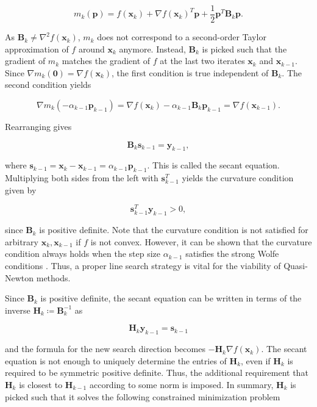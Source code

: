\begin{equation}\label{eq:quasi-newton-model}
    m_k(\bm{p}) = f(\bm{x}_k)  + \nabla f(\bm{x}_k)^T \bm{p} + \frac{1}{2} \bm{p}^T\bm{B}_k\bm{p}.
\end{equation}

\noindent As $\bm{B}_k \neq \nabla^2 f(\bm{x}_k)$, $m_k$ does not correspond to a second-order Taylor approximation of $f$ around 
$\bm{x}_k$ anymore. Instead, $\bm{B}_k$ is picked such that the gradient of $m_k$ matches the gradient of $f$ at the last two iterates 
$\bm{x}_k$ and $\bm{x}_{k-1}$.
Since $\nabla m_{k}(\bm{0}) = \nabla f(\bm{x}_k)$, the first condition is true independent of $\bm{B}_k$. The 
second condition yields

\[
    \nabla m_{k}(-\alpha_{k-1}\bm{p}_{k-1}) = \nabla f(\bm{x}_k) - \alpha_{k-1}\bm{B}_{k}\bm{p}_{k-1} = \nabla f(\bm{x}_{k-1}).
\]

\noindent Rearranging gives

\begin{equation}\label{eq:secant-equation}
    \bm{B}_k \bm{s}_{k-1} = \bm{y}_{k-1},
\end{equation}

\noindent where $\bm{s}_{k-1} = \bm{x}_k - \bm{x}_{k-1} = \alpha_{k-1}\bm{p}_{k-1}$. This is called the secant equation. 
Multiplying both sides from the left with $\bm{s}_{k-1}^T$ yields the curvature condition given by

\begin{equation}\label{eq:curvature-condition}
    \bm{s}_{k-1}^T \bm{y}_{k-1} > 0,
\end{equation}

\noindent since $\bm{B}_k$ is positive definite. Note that the curvature condition is not satisfied for arbitrary $\bm{x}_k, \bm{x}_{k-1}$ 
if $f$ is 
not convex. However, it can be shown that the curvature condition always holds when the step size $\alpha_{k-1}$ satisfies the strong Wolfe 
conditions \cite{nocedal2006}. Thus, a proper line search strategy is vital for the viability of Quasi-Newton methods.

Since $\bm{B}_k$ is positive definite, the secant equation can be written in terms of the inverse $\bm{H}_k \coloneqq \bm{B}^{-1}_k$ as

\[
    \bm{H}_k \bm{y}_{k-1} = \bm{s}_{k-1}
\]

\noindent and the formula for the new search direction becomes $-\bm{H}_k \nabla f(\bm{x}_k)$. The secant equation is not enough to uniquely determine
the entries of $\bm{H}_k$, even if $\bm{H}_k$ is required to be symmetric positive definite. Thus, the additional requirement that $\bm{H}_k$
is closest to $\bm{H}_{k-1}$ according to some norm is imposed. In summary, $\bm{H}_k$ is picked such that it solves the following constrained
minimization problem

